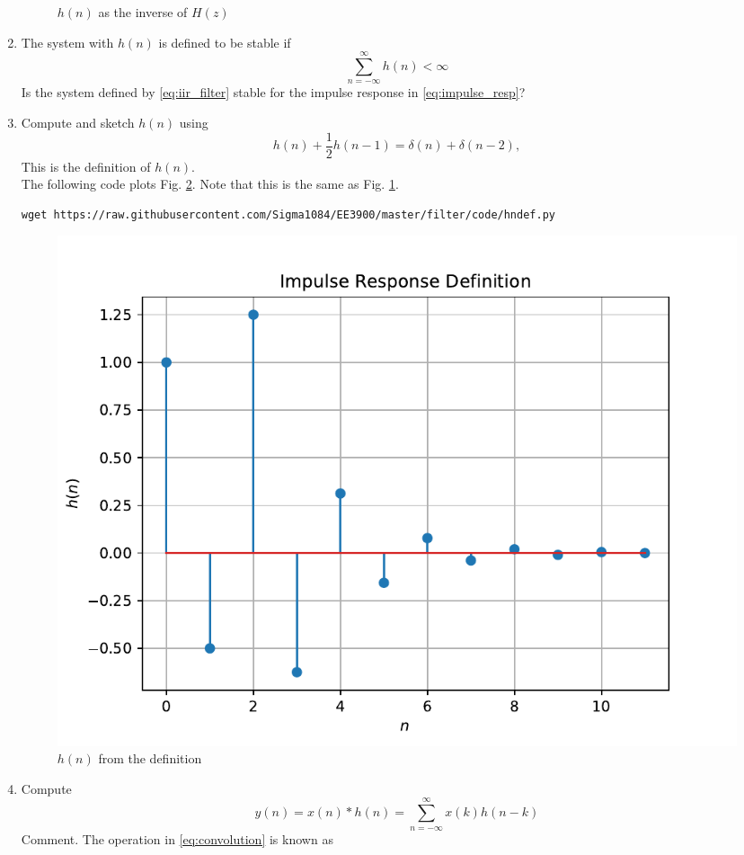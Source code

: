 \documentclass[journal,12pt,twocolumn]{IEEEtran}
\renewcommand\thesection{\arabic{section}}
\begin{document}
\begin{enumerate}[label=\thesection.\arabic*]
\begin{figure}[!ht]
\caption{$h(n)$ as the inverse of $H(z)$}
\label{fig:hn}
\end{figure}
%
\item The system with $h(n)$ is defined to be stable if
\begin{equation}
\sum_{n=-\infty}^{\infty}h(n) < \infty
\end{equation}
Is the system defined by \eqref{eq:iir_filter} stable for the impulse response in \eqref{eq:impulse_resp}?
%
\item 
Compute and sketch $h(n)$ using 
\begin{equation}
\label{eq:iir_filter_h}
h(n) + \frac{1}{2}h(n-1) = \delta(n) + \delta(n-2), 
\end{equation}
%
This is the definition of $h(n)$.
\\
\solution The following code plots Fig. \ref{fig:hndef}. Note that this is the same as Fig. 
\ref{fig:hn}. 
%
\begin{lstlisting}
wget https://raw.githubusercontent.com/Sigma1084/EE3900/master/filter/code/hndef.py
\end{lstlisting}
\begin{figure}[!ht]
\centering
\includegraphics[width=\columnwidth]{./figs/hndef}
\caption{$h(n)$ from the definition}
\label{fig:hndef}
\end{figure}
%
\item Compute 
%
\begin{equation}
\label{eq:convolution}
y(n) = x(n)*h(n) = \sum_{n=-\infty}^{\infty}x(k)h(n-k)
\end{equation}
%
Comment. The operation in \eqref{eq:convolution} is known as

\end{enumerate}
\end{document}
